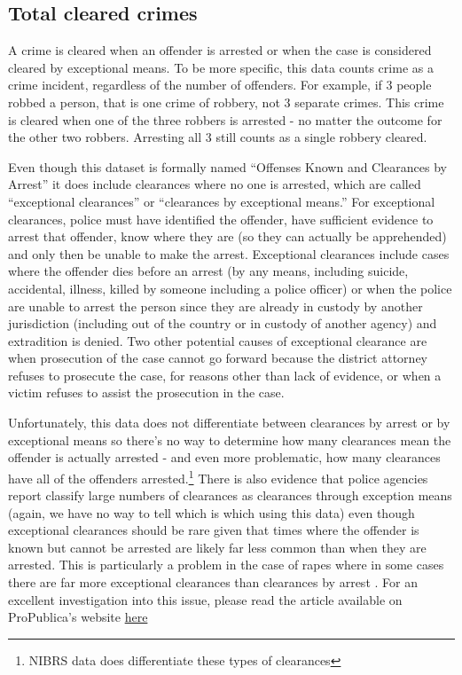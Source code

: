 \documentclass[
  12pt,
  openany]{book}
\begin{document}
\hypertarget{clearedCrimes}{%
\subsection{Total cleared crimes}\label{clearedCrimes}}

A crime is cleared when an offender is arrested or when the case is considered cleared by exceptional means. To be more specific, this data counts crime as a crime incident, regardless of the number of offenders. For example, if 3 people robbed a person, that is one crime of robbery, not 3 separate crimes. This crime is cleared when one of the three robbers is arrested - no matter the outcome for the other two robbers. Arresting all 3 still counts as a single robbery cleared.

Even though this dataset is formally named ``Offenses Known and Clearances by Arrest'' it does include clearances where no one is arrested, which are called ``exceptional clearances'' or ``clearances by exceptional means.'' For exceptional clearances, police must have identified the offender, have sufficient evidence to arrest that offender, know where they are (so they can actually be apprehended) and only then be unable to make the arrest. Exceptional clearances include cases where the offender dies before an arrest (by any means, including suicide, accidental, illness, killed by someone including a police officer) or when the police are unable to arrest the person since they are already in custody by another jurisdiction (including out of the country or in custody of another agency) and extradition is denied. Two other potential causes of exceptional clearance are when prosecution of the case cannot go forward because the district attorney refuses to prosecute the case, for reasons other than lack of evidence, or when a victim refuses to assist the prosecution in the case.

Unfortunately, this data does not differentiate between clearances by arrest or by exceptional means so there's no way to determine how many clearances mean the offender is actually arrested - and even more problematic, how many clearances have all of the offenders arrested.\footnote{NIBRS data does differentiate these types of clearances} There is also evidence that police agencies report classify large numbers of clearances as clearances through exception means (again, we have no way to tell which is which using this data) even though exceptional clearances should be rare given that times where the offender is known but cannot be arrested are likely far less common than when they are arrested. This is particularly a problem in the case of rapes where in some cases there are far more exceptional clearances than clearances by arrest \citep{yeung2018comes}. For an excellent investigation into this issue, please read the \citet{yeung2018comes} article available on ProPublica's website \href{https://www.propublica.org/article/when-it-comes-to-rape-just-because-a-case-is-cleared-does-not-mean-solved}{here}
\end{document}
